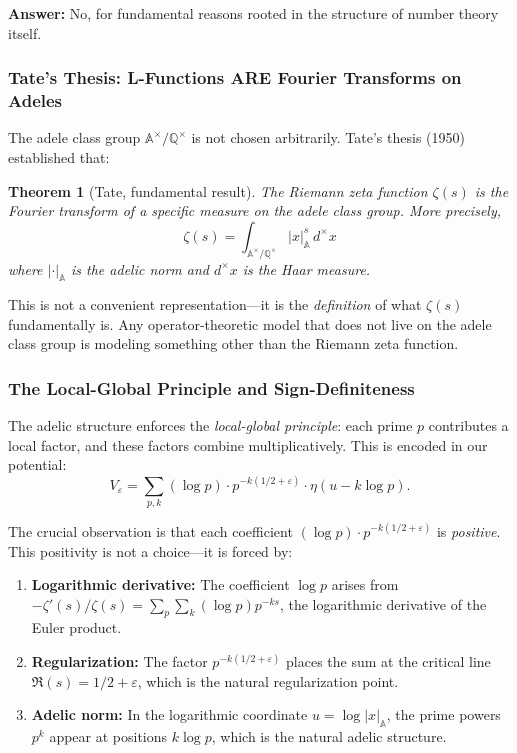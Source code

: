 ﻿\documentclass[12pt,a4paper]{article}
\newtheorem{theorem}{Theorem}[section]
\theoremstyle{definition}
\theoremstyle{remark}
\begin{document}
\textbf{Answer:} No, for fundamental reasons rooted in the structure of number theory itself.

\subsubsection{Tate's Thesis: L-Functions ARE Fourier Transforms on Adeles}

The adele class group $\mathbb{A}^\times / \mathbb{Q}^\times$ is not chosen arbitrarily. Tate's thesis (1950) established that:

\begin{theorem}[Tate, fundamental result]
The Riemann zeta function $\zeta(s)$ is the Fourier transform of a specific measure on the adele class group. More precisely,
\[
\zeta(s) = \int_{\mathbb{A}^\times / \mathbb{Q}^\times} |x|_{\mathbb{A}}^s \, d^\times x
\]
where $|\cdot|_{\mathbb{A}}$ is the adelic norm and $d^\times x$ is the Haar measure.
\end{theorem}

This is not a convenient representation---it is the \emph{definition} of what $\zeta(s)$ fundamentally is. Any operator-theoretic model that does not live on the adele class group is modeling something other than the Riemann zeta function.

\subsubsection{The Local-Global Principle and Sign-Definiteness}

The adelic structure enforces the \emph{local-global principle}: each prime $p$ contributes a local factor, and these factors combine multiplicatively. This is encoded in our potential:
\[
V_\varepsilon = \sum_{p,k} (\log p) \cdot p^{-k(1/2+\varepsilon)} \cdot \eta(u - k\log p).
\]

The crucial observation is that each coefficient $(\log p) \cdot p^{-k(1/2+\varepsilon)}$ is \emph{positive}. This positivity is not a choice---it is forced by:

\begin{enumerate}
\item \textbf{Logarithmic derivative:} The coefficient $\log p$ arises from $-\zeta'(s)/\zeta(s) = \sum_p \sum_k (\log p) p^{-ks}$, the logarithmic derivative of the Euler product.

\item \textbf{Regularization:} The factor $p^{-k(1/2+\varepsilon)}$ places the sum at the critical line $\Re(s) = 1/2 + \varepsilon$, which is the natural regularization point.

\item \textbf{Adelic norm:} In the logarithmic coordinate $u = \log |x|_{\mathbb{A}}$, the prime powers $p^k$ appear at positions $k \log p$, which is the natural adelic structure.
\end{enumerate}
\end{document}
